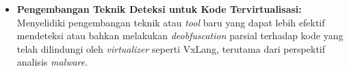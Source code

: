 \begin{enumerate}
\begin{itemize}
            \item \textbf{Pengembangan Teknik Deteksi untuk Kode Tervirtualisasi:} Menyelidiki pengembangan teknik atau \textit{tool} baru yang dapat lebih efektif mendeteksi atau bahkan melakukan \textit{deobfuscation} parsial terhadap kode yang telah dilindungi oleh \textit{virtualizer} seperti VxLang, terutama dari perspektif analisis \textit{malware}.
        \end{itemize}
\end{enumerate}
